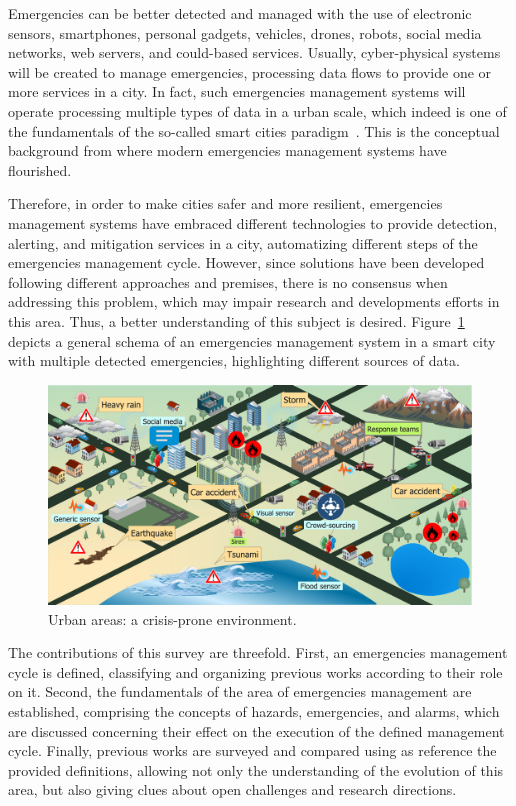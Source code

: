 \begin{refsection}
Emergencies can be better detected and managed with the use of electronic sensors, smartphones, personal gadgets, vehicles, drones, robots, social media networks, web servers, and could-based services. Usually, cyber-physical systems will be created to manage emergencies, processing data flows to provide one or more services in a city. In fact, such emergencies management systems will operate processing multiple types of data in a urban scale, which indeed is one of the fundamentals of the so-called smart cities paradigm~\cite{smartcities4}. This is the conceptual background from where modern emergencies management systems have flourished.

Therefore, in order to make cities safer and more resilient, emergencies management systems have embraced different technologies to provide detection, alerting, and mitigation services in a city, automatizing different steps of the emergencies management cycle. However, since solutions have been developed following different approaches and premises, there is no consensus when addressing this problem, which may impair research and developments efforts in this area. Thus, a better understanding of this subject is desired. Figure~\ref{Fig:general} depicts a general schema of an emergencies management system in a smart city with multiple detected emergencies, highlighting different sources of data.

\begin{figure}[htbp]
  \centering
  \includegraphics[scale=0.35]{Chapters/1-Survey/images/general.pdf}
  \caption{Urban areas: a crisis-prone environment.}\label{Fig:general}
\end{figure}

The contributions of this survey are threefold. First, an emergencies management cycle is defined, classifying and organizing previous works according to their role on it. Second, the fundamentals of the area of emergencies management are established, comprising the concepts of hazards, emergencies, and alarms, which are discussed concerning their effect on the execution of the defined management cycle. Finally, previous works are surveyed and compared using as reference the provided definitions, allowing not only the understanding of the evolution of this area, but also giving clues about open challenges and research directions.


\end{refsection}
